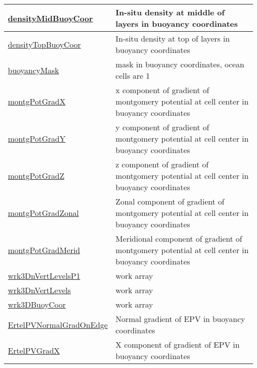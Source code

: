 {\begin{center}
\begin{longtable}{| p{2.0in} | p{4.0in} |}
    \hline
    \hyperref[subsec:var_sec_eliassenPalmAMPKGScratch_densityMidBuoyCoor]{densityMidBuoyCoor} & In-situ density at middle of layers in buoyancy coordinates \\
    \hline
    \hyperref[subsec:var_sec_eliassenPalmAMPKGScratch_densityTopBuoyCoor]{densityTopBuoyCoor} & In-situ density at top of layers in buoyancy coordinates \\
    \hline
    \hyperref[subsec:var_sec_eliassenPalmAMPKGScratch_buoyancyMask]{buoyancyMask} & mask in buoyancy coordinates, ocean cells are 1 \\
    \hline
    \hyperref[subsec:var_sec_eliassenPalmAMPKGScratch_montgPotGradX]{montgPotGradX} & x component of gradient of montgomery potential at cell center in buoyancy coordinates \\
    \hline
    \hyperref[subsec:var_sec_eliassenPalmAMPKGScratch_montgPotGradY]{montgPotGradY} & y component of gradient of montgomery potential at cell center in buoyancy coordinates \\
    \hline
    \hyperref[subsec:var_sec_eliassenPalmAMPKGScratch_montgPotGradZ]{montgPotGradZ} & z component of gradient of montgomery potential at cell center in buoyancy coordinates \\
    \hline
    \hyperref[subsec:var_sec_eliassenPalmAMPKGScratch_montgPotGradZonal]{montgPotGradZonal} & Zonal component of gradient of montgomery potential at cell center in buoyancy coordinates \\
    \hline
    \hyperref[subsec:var_sec_eliassenPalmAMPKGScratch_montgPotGradMerid]{montgPotGradMerid} & Meridional component of gradient of montgomery potential at cell center in buoyancy coordinates \\
    \hline
    \hyperref[subsec:var_sec_eliassenPalmAMPKGScratch_wrk3DnVertLevelsP1]{wrk3DnVertLevelsP1} & work array \\
    \hline
    \hyperref[subsec:var_sec_eliassenPalmAMPKGScratch_wrk3DnVertLevels]{wrk3DnVertLevels} & work array \\
    \hline
    \hyperref[subsec:var_sec_eliassenPalmAMPKGScratch_wrk3DBuoyCoor]{wrk3DBuoyCoor} & work array \\
    \hline
    \hyperref[subsec:var_sec_eliassenPalmAMPKGScratch_ErtelPVNormalGradOnEdge]{ErtelPVNormalGradOnEdge} & Normal gradient of EPV in buoyancy coordinates \\
    \hline
    \hyperref[subsec:var_sec_eliassenPalmAMPKGScratch_ErtelPVGradX]{ErtelPVGradX} & X component of gradient of EPV in buoyancy coordinates \\

\end{longtable}
\end{center}}
